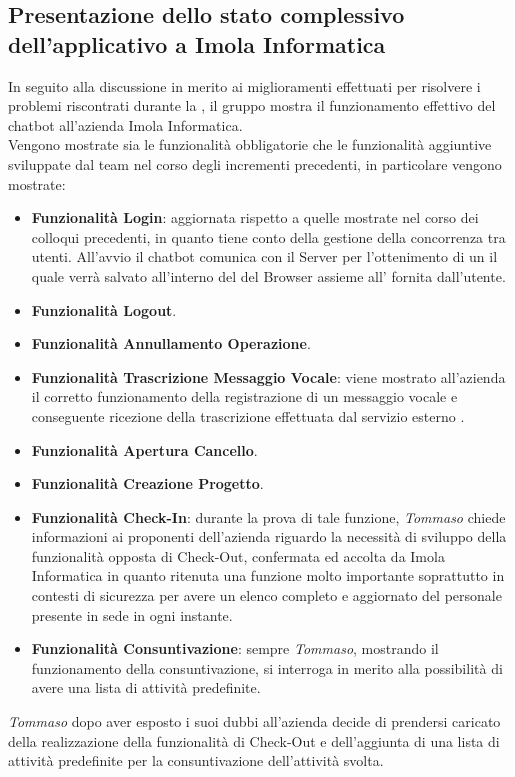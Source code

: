 \newpage
\subsection{Presentazione dello stato complessivo     dell'applicativo a Imola Informatica}
In seguito alla discussione in merito ai miglioramenti effettuati per risolvere i problemi riscontrati durante la ,
il gruppo mostra il funzionamento effettivo del chatbot all'azienda Imola Informatica. \\
Vengono mostrate sia le funzionalità obbligatorie che le funzionalità aggiuntive sviluppate dal team nel corso degli incrementi precedenti, 
in particolare vengono mostrate: 
\begin{itemize}
    \item \textbf{Funzionalità Login}: aggiornata rispetto a quelle mostrate nel corso dei colloqui precedenti, in quanto tiene conto della gestione della concorrenza tra utenti. All'avvio il chatbot comunica con il Server per l'ottenimento di un  il quale verrà salvato all'interno del  del Browser assieme all' fornita dall'utente. 
    \item \textbf{Funzionalità Logout}.
    \item \textbf{Funzionalità Annullamento Operazione}.
    \item \textbf{Funzionalità Trascrizione Messaggio Vocale}: viene mostrato all'azienda il corretto funzionamento della registrazione di un messaggio vocale e conseguente ricezione della trascrizione effettuata dal servizio esterno .
    \item \textbf{Funzionalità Apertura Cancello}.
    \item \textbf{Funzionalità Creazione Progetto}.
    \item \textbf{Funzionalità Check-In}: durante la prova di tale funzione, \textit{Tommaso} chiede informazioni ai proponenti dell'azienda riguardo la necessità 
    di sviluppo della funzionalità opposta di Check-Out, confermata ed accolta da Imola Informatica in quanto ritenuta una funzione molto importante soprattutto in contesti di sicurezza per avere un elenco completo e aggiornato del personale presente in sede in ogni instante. 
    \item \textbf{Funzionalità Consuntivazione}: sempre \textit{Tommaso}, mostrando il funzionamento della consuntivazione, si interroga in merito alla possibilità di avere una lista di attività predefinite. 
\end{itemize}
\textit{Tommaso} dopo aver esposto i suoi dubbi all'azienda decide di prendersi caricato della realizzazione della funzionalità di Check-Out e dell'aggiunta di una lista di attività predefinite per la consuntivazione dell'attività svolta.

